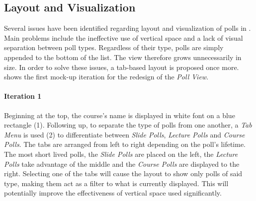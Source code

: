 \subsection{Layout and Visualization}
Several issues have been identified regarding layout and visualization of polls in . Main problems include the ineffective use of vertical space and a lack of visual separation between poll types. Regardless of their type, polls are simply appended to the bottom of the list.
The view therefore grows unnecessarily in size. In order to solve these issues, a tab-based layout is proposed once more.  shows the first mock-up iteration for the redesign of the \emph{Poll View}.
\paragraph{Iteration 1}
Beginning at the top, the course's name is displayed in white font on a blue rectangle (1). Following up, to separate the type of polls from one another, a \emph{Tab Menu} is used (2) to differentiate between \emph{Slide Polls}, \emph{Lecture Polls} and \emph{Course Polls}. The tabs are arranged from left to right depending on the poll's lifetime. The most short lived polls, the \emph{Slide Polls} are placed on the left, the \emph{Lecture Polls} take advantage of the middle and the \emph{Course Polls} are displayed to the right. Selecting one of the tabs will cause the layout to show only polls of said type, making them act as a filter to what is currently displayed. This will potentially improve the effectiveness of vertical space used significantly. 

